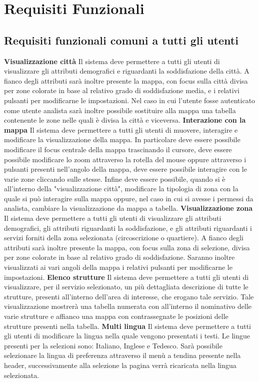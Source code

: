 \chapter{Requisiti Funzionali} 
    \section{Requisiti funzionali comuni a tutti gli utenti}
        \begin{rfList}
            \rfItem \textbf{Visualizzazione città} Il sistema deve permettere a tutti gli utenti di visualizzare gli attributi demografici e riguardanti la soddisfazione della città. A fianco degli attributi sarà inoltre presente la mappa, con focus sulla città divisa per zone colorate in base al relativo grado di soddisfazione media, e i relativi pulsanti per modificarne le impostazioni. Nel caso in cui l'utente fosse autenticato come utente analista sarà inoltre possibile sostituire alla mappa una tabella contenente le zone nelle quali è divisa la città e viceversa.
            \rfItem \textbf{Interazione con la mappa} Il sistema deve permettere a tutti gli utenti di muovere, interagire e modificare la visualizzazione della mappa. In particolare deve essere possibile modificare il focus centrale della mappa trascinando il cursore, deve essere possibile modificare lo zoom attraverso la rotella del mouse oppure attraverso i pulsanti presenti nell'angolo della mappa, deve essere possibile interagire con le varie zone cliccando sulle stesse. Infine deve essere possibile, quando si è all'interno della "visualizzazione città", modificare la tipologia di zona con la quale si può interagire sulla mappa oppure, nel caso in cui si avesse i permessi da analista, cambiare la visualizzazione da mappa a tabella.
            \rfItem \textbf{Visualizzazione zona} Il sistema deve permettere a tutti gli utenti di visualizzare gli attributi demografici, gli attributi riguardanti la soddisfazione, e gli attributi riguardanti i servizi forniti della zona selezionata (circoscrizione o quartiere). A fianco degli attributi sarà inoltre presente la mappa, con focus sulla zona di selezione, divisa per zone colorate in base al relativo grado di soddisfazione. Saranno inoltre visualizzati ai vari angoli della mappa i relativi pulsanti per modificarne le impostazioni.
            \rfItem \textbf{Elenco strutture} Il sistema deve permettere a tutti gli utenti di visualizzare, per il servizio selezionato, un più dettagliata descrizione di tutte le strutture, presenti all'interno dell'area di interesse, che erogano tale servizio. Tale visualizzazione mostrerà una tabella numerata con all'interno il nominativo delle varie strutture e affianco una mappa con contrassegnate le posizioni delle strutture presenti nella tabella.
            \rfItem \textbf{Multi lingua} Il sistema deve permettere a tutti gli utenti di modificare la lingua nella quale vengono presentati i testi. Le lingue presenti per la selezioni sono: Italiano, Inglese e Tedesco. Sarà possibile selezionare la lingua di preferenza attraverso il menù a tendina presente nella header, successivamente alla selezione la pagina verrà ricaricata nella lingua selezionata.
        \end{rfList}
